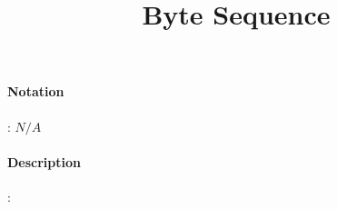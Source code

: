 \documentclass[10pt,a4paper,oneside]{scrartcl}
\title{Byte Sequence}
\date{}
\begin{document}
\maketitle
\paragraph{Notation}: $N/A$
\paragraph{Description}:  
\end{document}
